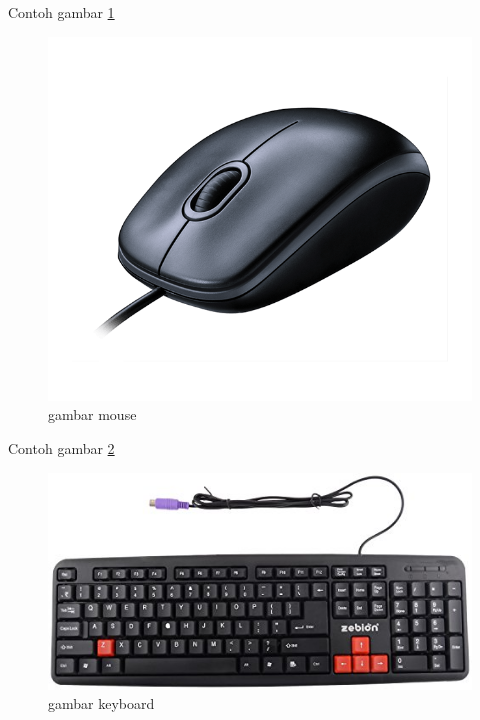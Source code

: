 Contoh gambar \ref{m100-gallery.png}

\begin{figure}[ht]
\centerline{\includegraphics[width=1\textwidth]{figures/m100-gallery.png}}
\caption{gambar mouse}
\label{m100-gallery.png}
\end{figure}

Contoh gambar \ref{41skLxWQtyL.jpg}

\begin{figure}[ht]
\centerline{\includegraphics[width=1\textwidth]{figures/41skLxWQtyL.jpg}}
\caption{gambar keyboard}
\label{41skLxWQtyL.jpg}
\end{figure}

